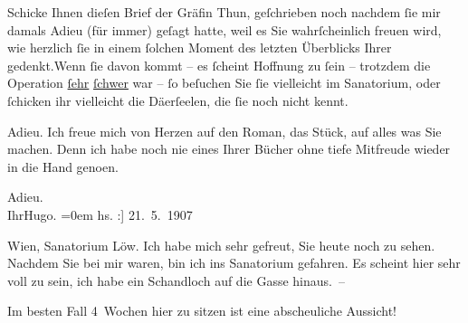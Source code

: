 \pstart
           {\pb}Schicke Ihnen dieſen Brief der
               Gräfin Thun, geſchrieben noch nachdem ſie mir
               damals Adieu (für immer) geſagt hatte, weil es Sie wahrſcheinlich freuen wird, wie
               herzlich ſie in einem ſolchen Moment des letzten Überblicks Ihrer gedenkt.\hspace*{1.5em}Wenn ſie davon kommt – es {\pb}ſcheint Hoffnung zu ſein –
               trotzdem die Operation \uline{ſehr}{ }\uline{ſchwer} war – ſo beſuchen Sie ſie vielleicht im Sanatorium, oder ſchicken ihr
               vielleicht die Dä{\geminationm}erſeelen, die ſie noch nicht kennt.\pend
           
\pstart
           Adieu. Ich freue mich von Herzen auf den Roman, das Stück, auf alles was Sie machen. {\pb}Denn ich habe noch nie eines Ihrer
               Bücher ohne tiefe Mitfreude wieder in die Hand geno{\geminationm}en.\pend
           
\pstart
           Adieu.{\\[\baselineskip]}Ihr\spacefill\mbox{Hugo.}\pend
           \leftskip=0em{}\vspace{1em}{\vspace{1\baselineskip}}
\pstart
           \raggedleft{}{\pb}{[}hs. :{]} 21. 5. 1907\pend
           
\pstart
           \raggedleft{}Wien, Sanatorium Löw.\pend
           \vspace{0.5em}
\pstart
           Ich habe mich sehr gefreut, Sie heute noch zu sehen. Nachdem Sie bei mir waren, bin
               ich ins Sanatorium gefahren. Es
               scheint hier sehr voll zu sein, {\kaufmannsund} ich habe ein
               Schandloch auf die Gasse hinaus. –\pend
           
\pstart
           Im besten Fall 4 Wochen hier zu sitzen ist eine abscheuliche Aussicht!\pend
           
